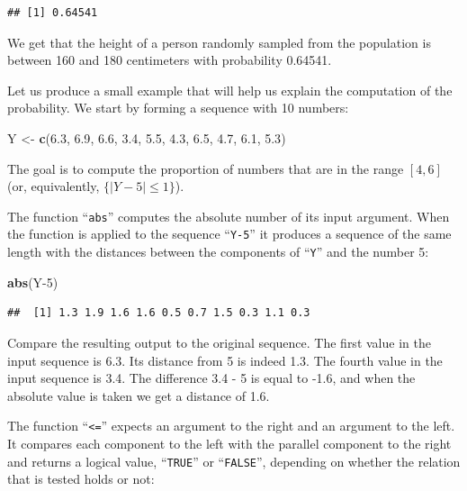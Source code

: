 \documentclass[]{krantz}
\makeatletter
\newenvironment{Shaded}{\begin{snugshade}}{\end{snugshade}}
\newcommand{\DecValTok}[1]{\textcolor[rgb]{0.00,0.00,0.81}{#1}}
\newcommand{\FloatTok}[1]{\textcolor[rgb]{0.00,0.00,0.81}{#1}}
\newcommand{\KeywordTok}[1]{\textcolor[rgb]{0.13,0.29,0.53}{\textbf{#1}}}
\newcommand{\NormalTok}[1]{#1}
\newcommand{\StringTok}[1]{\textcolor[rgb]{0.31,0.60,0.02}{#1}}
\newenvironment{kframe}{%
\medskip{}
\setlength{\fboxsep}{.8em}
 \def\at@end@of@kframe{}%
 \ifinner\ifhmode%
  \def\at@end@of@kframe{\end{minipage}}%
  \begin{minipage}{\columnwidth}%
 \fi\fi%
 \def\FrameCommand##1{\hskip\@totalleftmargin \hskip-\fboxsep
 \colorbox{shadecolor}{##1}\hskip-\fboxsep
     \hskip-\linewidth \hskip-\@totalleftmargin \hskip\columnwidth}%
 \MakeFramed {\advance\hsize-\width
   \@totalleftmargin\z@ \linewidth\hsize
   \@setminipage}}%
 {\par\unskip\endMakeFramed%
 \at@end@of@kframe}
\renewenvironment{Shaded}{\begin{kframe}}{\end{kframe}}
\theoremstyle{definition}
\theoremstyle{definition}
\theoremstyle{definition}
\theoremstyle{remark}
\makeatother
\begin{document}
\begin{verbatim}
## [1] 0.64541
\end{verbatim}

We get that the height of a person randomly sampled from the population
is between 160 and 180 centimeters with probability 0.64541.

Let us produce a small example that will help us explain the computation
of the probability. We start by forming a sequence with 10 numbers:

\begin{Shaded}
\begin{Highlighting}[]
\NormalTok{Y <-}\StringTok{ }\KeywordTok{c}\NormalTok{(}\FloatTok{6.3}\NormalTok{, }\FloatTok{6.9}\NormalTok{, }\FloatTok{6.6}\NormalTok{, }\FloatTok{3.4}\NormalTok{, }\FloatTok{5.5}\NormalTok{, }\FloatTok{4.3}\NormalTok{, }\FloatTok{6.5}\NormalTok{, }\FloatTok{4.7}\NormalTok{, }\FloatTok{6.1}\NormalTok{, }\FloatTok{5.3}\NormalTok{)}
\end{Highlighting}
\end{Shaded}

The goal is to compute the proportion of numbers that are in the range
\([4,6]\) (or, equivalently, \(\{|Y-5| \leq 1\}\)).

The function ``\texttt{abs}'' computes the absolute number of its input argument.
When the function is applied to the sequence ``\texttt{Y-5}'' it produces a
sequence of the same length with the distances between the components of
``\texttt{Y}'' and the number 5:

\begin{Shaded}
\begin{Highlighting}[]
\KeywordTok{abs}\NormalTok{(Y}\DecValTok{-5}\NormalTok{)}
\end{Highlighting}
\end{Shaded}

\begin{verbatim}
##  [1] 1.3 1.9 1.6 1.6 0.5 0.7 1.5 0.3 1.1 0.3
\end{verbatim}

Compare the resulting output to the original sequence. The first value
in the input sequence is 6.3. Its distance from 5 is indeed 1.3. The
fourth value in the input sequence is 3.4. The difference 3.4 - 5 is
equal to -1.6, and when the absolute value is taken we get a distance of
1.6.

The function ``\texttt{\textless{}=}'' expects an argument to the right and an argument to
the left. It compares each component to the left with the parallel
component to the right and returns a logical value, ``\texttt{TRUE}'' or
``\texttt{FALSE}'', depending on whether the relation that is tested holds or
not:
\end{document}
